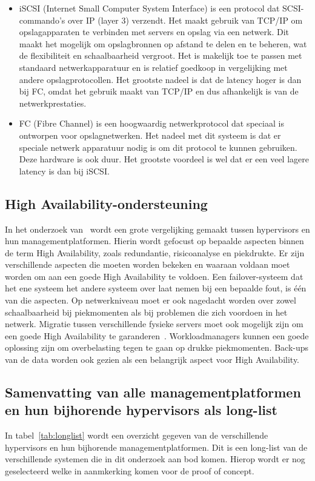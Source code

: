\begin{itemize}
    \item iSCSI (Internet Small Computer System Interface) is een protocol dat SCSI-commando's over IP (layer 3) verzendt. Het maakt gebruik van TCP/IP om opslagapparaten te verbinden met servers en opslag via een netwerk. Dit maakt het mogelijk om opslagbronnen op afstand te delen en te beheren, wat de flexibiliteit en schaalbaarheid vergroot. Het is makelijk toe te passen met standaard netwerkapparatuur en is relatief goedkoop in vergelijking met andere opslagprotocollen. Het grootste nadeel is dat de latency hoger is dan bij FC, omdat het gebruik maakt van TCP/IP en dus afhankelijk is van de netwerkprestaties.
    \item FC (Fibre Channel) is een hoogwaardig netwerkprotocol dat speciaal is ontworpen voor opslagnetwerken. Het nadeel met dit systeem is dat er speciale netwerk apparatuur nodig is om dit protocol te kunnen gebruiken. Deze hardware is ook duur. Het grootste voordeel is wel dat er een veel lagere latency is dan bij iSCSI. 
\end{itemize}


\subsection{High Availability-ondersteuning}\label{subsec:ha}
In het onderzoek van~\textcite{dudnik2017creating} wordt een grote vergelijking gemaakt tussen hypervisors en hun managementplatformen. Hierin wordt gefocust op bepaalde aspecten binnen de term High Availability, zoals redundantie, risicoanalyse en piekdrukte.
Er zijn verschillende aspecten die moeten worden bekeken en waaraan voldaan moet worden om aan een goede High Availability te voldoen. Een failover-systeem dat het ene systeem het andere systeem over laat nemen bij een bepaalde fout, is één van die aspecten.
Op netwerkniveau moet er ook nagedacht worden over zowel schaalbaarheid bij piekmomenten als bij problemen die zich voordoen in het netwerk. Migratie tussen verschillende fysieke servers moet ook mogelijk zijn om een goede High Availability te garanderen~\autocite{dudnik2017creating}.
Workloadmanagers kunnen een goede oplossing zijn om overbelasting tegen te gaan op drukke piekmomenten. Back-ups van de data worden ook gezien als een belangrijk aspect voor High Availability.


\subsection{Samenvatting van alle managementplatformen en hun bijhorende hypervisors als long-list}\label{subsec:samenvatting}
In tabel~\ref{tab:longlist} wordt een overzicht gegeven van de verschillende hypervisors en hun bijhorende managementplatformen. Dit is een long-list van de verschillende systemen die in dit onderzoek aan bod komen. Hierop wordt er nog geselecteerd welke in aanmkerking komen voor de proof of concept.

